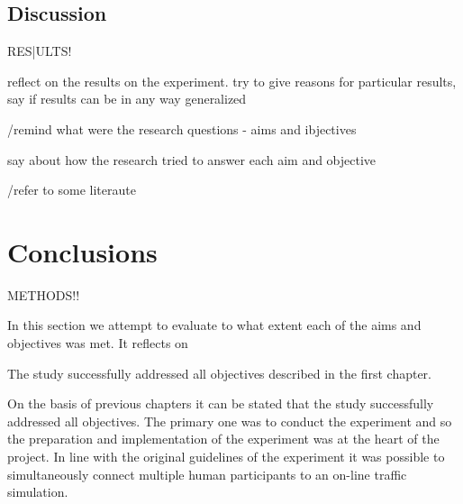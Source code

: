 \documentclass[11pt,english]{article}
\begin{document}





\subsection{Discussion}
RES|ULTS!

reflect on the results on the experiment. try to give reasons for particular results, say if results can be in any way generalized





/remind what were the research questions - aims and ibjectives


say about how the research tried to answer each aim and objective




/refer to some literaute 









\section{Conclusions}
METHODS!!



In this section we attempt to evaluate to what extent each of the aims and objectives was met. It reflects on 



\par

The study successfully addressed all objectives described in the first chapter.

On the basis of previous chapters it can be stated that the study successfully addressed all objectives. The primary one was to conduct the experiment and so the preparation and implementation of the experiment was at the heart of the project. In line with the original guidelines of the experiment it was possible to simultaneously connect multiple human participants to an on-line traffic simulation.
\end{document}

